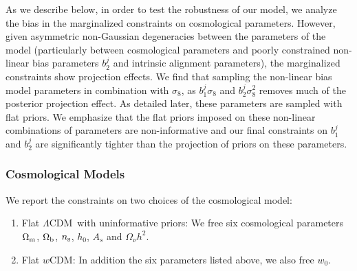 \documentclass[fleqn,usenatbib]{mnras}
\newcommand{\gammat}{\ensuremath{\gamma_{\rm t}(\theta)}}
\newcommand{\wtheta}{\ensuremath{w(\theta)}}
\newcommand{\lcdm}{$\Lambda$CDM}
\newcommand{\wcdm}{$w$CDM}
\newcommand{\red}[1]{\textcolor{red}{#1}}
\begin{document}
\begin{enumerate}
    As we describe below, in order to test the robustness of our model, we analyze the bias in the marginalized constraints on cosmological parameters. However, given asymmetric non-Gaussian degeneracies between the parameters of the model (particularly between cosmological parameters and poorly constrained non-linear bias parameters $b^{j}_2$ and intrinsic alignment parameters), the marginalized constraints show projection effects. We find that sampling the non-linear bias model parameters in combination with $\sigma_8$, as $b^{j}_1 \sigma_8$ and $b^{j}_2 \sigma^2_8$ removes much of the posterior projection effect. As detailed later, these parameters are sampled with flat priors. We emphasize that the flat priors imposed on these non-linear combinations of parameters are non-informative and our final constraints on $b^{j}_1$ and $b^{j}_2$ are significantly tighter than the projection of priors on these parameters.
\end{enumerate}


\subsubsection{Cosmological Models}
\label{sec:cosmo_models}
We report the constraints on two choices of the cosmological model:
\begin{enumerate}
    \item Flat \lcdm\ with uninformative priors: We free six cosmological parameters $\Omega_{\rm m}$, $\Omega_{\rm b}$, $n_{\rm s}$, $h_0$, $A_s$ and $\Omega_\nu h^2$.
    \item Flat \wcdm : In addition the six parameters listed above, we also free $w_0$.
\end{enumerate}
\end{document}
